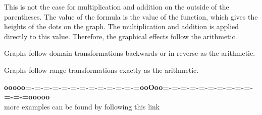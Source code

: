 \documentclass{ximera}
\begin{document}
This is not the case for multiplication and addition on the outside of the parentheses.  The value of the formula is the value of the function, which gives the heights of the dots on the graph.  The multiplication and addition is applied directly to this value.  Therefore, the graphical effects follow the arithmetic.


\begin{center}

Graphs follow domain transformations backwards or in reverse as the arithmetic.


\end{center}


\begin{center}

Graphs follow range transformations exactly as the arithmetic.


\end{center}













\begin{center}
\textbf{\textcolor{green!50!black}{ooooo=-=-=-=-=-=-=-=-=-=-=-=-=ooOoo=-=-=-=-=-=-=-=-=-=-=-=-=ooooo}} \\

more examples can be found by following this link\\ 

\end{center}
\end{document}
